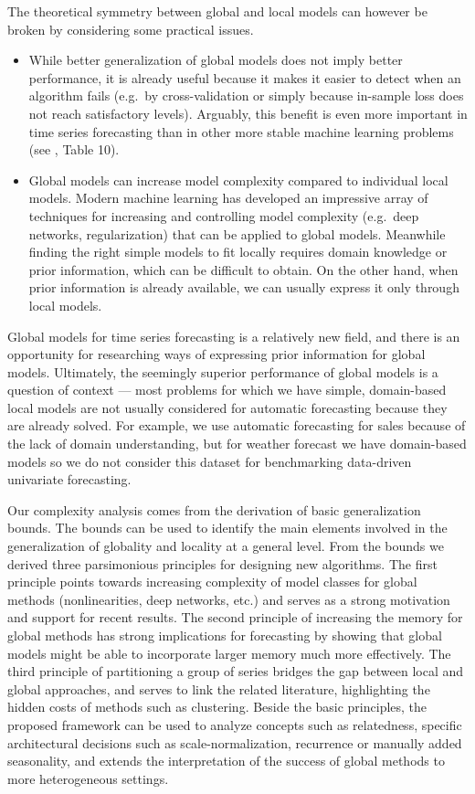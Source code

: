 \documentclass[a4paper]{article}
\theoremstyle{custom}
\begin{document}
The theoretical symmetry between global and local models can however be broken by considering some practical issues.
\begin{itemize}
\item While better generalization of global models does not imply better performance, it is already useful because it makes it easier to detect when an algorithm fails (e.g.\ by cross-validation or simply because in-sample loss does not reach satisfactory levels). Arguably, this benefit is even more important in time series forecasting than in other more stable machine learning problems (see \cite{makridakis2018statistical}, Table 10).
\item Global models can increase model complexity compared to individual local models.
 Modern machine learning has developed an impressive array of techniques for increasing and controlling model complexity (e.g.\ deep networks, regularization) that can be applied to global models. Meanwhile finding the right simple models to fit locally requires domain knowledge or prior information, which can be difficult to obtain.
On the other hand, when prior information is already available, we can usually express it only through local models.
\end{itemize}

Global models for time series forecasting is a relatively new field, and there is an opportunity for researching ways of expressing prior information for global models.
Ultimately, the seemingly superior performance of global models is a question of context --- most problems for which we have simple, domain-based local models are not usually considered for automatic forecasting because they are already solved. For example, we use automatic forecasting for sales because of the lack of domain understanding, but for weather forecast we have domain-based models so we do not consider this dataset for benchmarking data-driven univariate forecasting.

Our complexity analysis comes from the derivation of basic generalization bounds.
The bounds can be used to identify the main elements involved in the generalization of globality and locality at a general level.
From the bounds we derived three parsimonious principles for designing new algorithms.
The first principle points towards increasing complexity of model classes for global methods (nonlinearities, deep networks, etc.) and serves as a strong motivation and support for recent results.
The second principle of increasing the memory for global methods has strong implications for forecasting by showing that global models might be able to incorporate larger memory much more effectively.
The third principle of partitioning a group of series bridges the gap between local and global approaches, and serves to link the related literature, highlighting the hidden costs of methods such as clustering. Beside the basic principles, the proposed framework can be used to analyze concepts such as relatedness, specific architectural decisions such as scale-normalization, recurrence or manually added seasonality, and extends the interpretation of the success of global methods to more heterogeneous settings.
\end{document}

